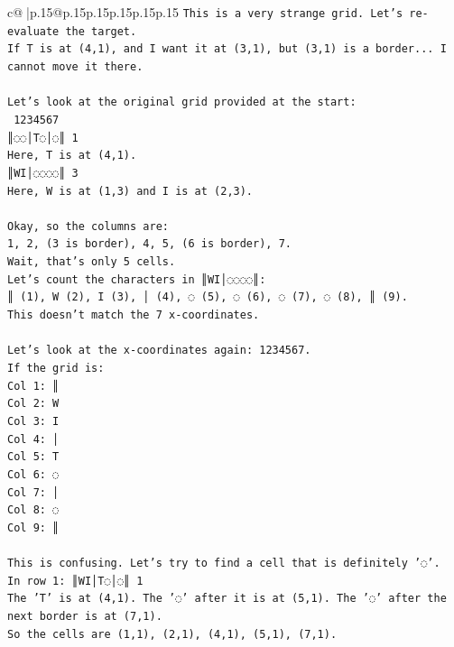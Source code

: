 \documentclass{article}
\begin{document}
{\begin{supertabular}{c@{$\;$}|p{.15\linewidth}@{}p{.15\linewidth}p{.15\linewidth}p{.15\linewidth}p{.15\linewidth}p{.15\linewidth}}
{{{\texttt{This is a very strange grid. Let's re{-}evaluate the target.} \\
\texttt{If T is at (4,1), and I want it at (3,1), but (3,1) is a border... I cannot move it there.} \\
\\ 
\texttt{Let's look at the original grid provided at the start:} \\
\texttt{ 1234567} \\
\texttt{║◌◌│T◌│◌║ 1} \\
\texttt{Here, T is at (4,1).} \\
\texttt{║WI│◌◌◌◌║ 3} \\
\texttt{Here, W is at (1,3) and I is at (2,3).} \\
\\ 
\texttt{Okay, so the columns are:} \\
\texttt{1, 2, (3 is border), 4, 5, (6 is border), 7.} \\
\texttt{Wait, that's only 5 cells.} \\
\texttt{Let's count the characters in ║WI│◌◌◌◌║:} \\
\texttt{║ (1), W (2), I (3), │ (4), ◌ (5), ◌ (6), ◌ (7), ◌ (8), ║ (9).} \\
\texttt{This doesn't match the 7 x{-}coordinates.} \\
\\ 
\texttt{Let's look at the x{-}coordinates again: 1234567.} \\
\texttt{If the grid is:} \\
\texttt{Col 1: ║} \\
\texttt{Col 2: W} \\
\texttt{Col 3: I} \\
\texttt{Col 4: │} \\
\texttt{Col 5: T} \\
\texttt{Col 6: ◌} \\
\texttt{Col 7: │} \\
\texttt{Col 8: ◌} \\
\texttt{Col 9: ║} \\
\\ 
\texttt{This is confusing. Let's try to find a cell that is definitely '◌'.} \\
\texttt{In row 1: ║WI│T◌│◌║ 1} \\
\texttt{The 'T' is at (4,1). The '◌' after it is at (5,1). The '◌' after the next border is at (7,1).} \\
\texttt{So the cells are (1,1), (2,1), (4,1), (5,1), (7,1).} \\
}}}
\end{supertabular}}
\end{document}
